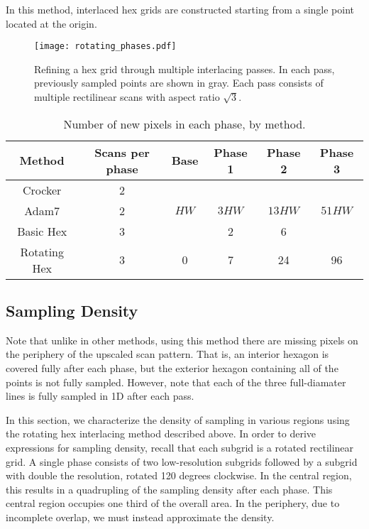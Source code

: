 \documentclass{article}
\begin{document}
In this method, interlaced hex grids are constructed starting from a single point
located at the origin.

\begin{figure}[ht]
\centering
\texttt{[image: rotating\_phases.pdf]}
\caption{
\label{fig:rotatingphases} Refining a hex grid through multiple interlacing passes.
%
In each pass, previously sampled points are shown in gray.
%
Each pass consists of multiple rectilinear scans with aspect ratio $\sqrt{3}$.
}
\end{figure}

\begin{table}[ht]
	\centering
\caption{\label{table:passsizes} Number of new pixels in each phase, by method.}
\begin{tabular}{c|c|cccc}
	Method & Scans per phase & Base & Phase 1 & Phase 2 & Phase 3 \\
	\hline
	Crocker & 2 & & & & \\
	Adam7 & 2 & $HW$ & $3HW$ & $13HW$ & $51HW$ \\
	Basic Hex & 3 &  & 2 & 6 & \\
	Rotating Hex & 3 & 0 & 7 & 24 & 96 \\
\end{tabular}
\end{table}

\subsection{Sampling Density}
\label{sec:density}

Note that unlike in other methods, using this method there are missing pixels on the periphery of the upscaled scan pattern.
%
That is, an interior hexagon is covered fully after each phase, but the exterior hexagon containing all of the points is not fully sampled.
%
However, note that each of the three full-diamater lines is fully sampled in 1D after each pass.


In this section, we characterize the density of sampling in various regions using the rotating hex interlacing method described above.
%
In order to derive expressions for sampling density, recall that each subgrid is a rotated rectilinear grid.
%
A single phase consists of two low-resolution subgrids followed by a subgrid with double the resolution, rotated 120 degrees clockwise.
%
In the central region, this results in a quadrupling of the sampling density after each phase.
%
This central region occupies one third of the overall area.
%
In the periphery, due to incomplete overlap, we must instead approximate the density.
\end{document}
